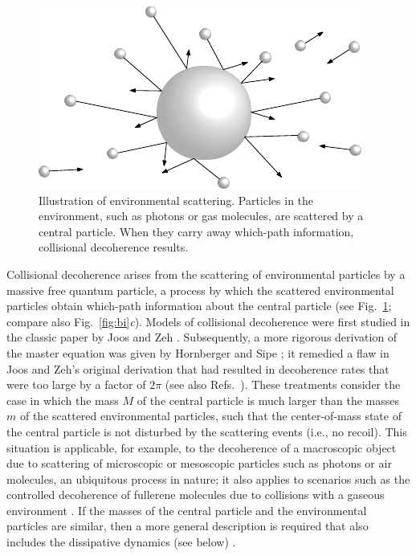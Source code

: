 \documentclass[3p,sort&compress,12pt]{elsarticle}
\begin{document}
\begin{figure}
\centering
\includegraphics[scale=0.7]{scatmod.pdf}
\caption{Illustration of environmental scattering. Particles in the environment, such as
  photons or gas molecules, are scattered by a central particle. When they carry away which-path information, collisional decoherence results.}
\label{fig:scatmod}
\end{figure}

Collisional decoherence arises from the scattering of environmental particles by a massive free quantum particle, a process by which the scattered environmental particles obtain which-path information about the central particle (see Fig.~\ref{fig:scatmod}; compare also Fig.~\ref{fig:bi}\emph{c}). Models of collisional decoherence were first studied in the classic paper by Joos and Zeh \cite{Joos:1985:iu}. Subsequently, a more rigorous derivation of the master equation was given by Hornberger and Sipe \cite{Hornberger:2003:un}; it remedied a flaw in Joos and Zeh's original derivation that had resulted in decoherence rates that were too large by a factor of $2\pi$ (see also Refs.~\cite{Gallis:1990:un,Diosi:1995:um,Adler:2006:yb}). These treatments consider the case in which the mass $M$ of the central particle is much larger than the masses $m$ of the scattered environmental particles, such that the center-of-mass state of the central particle is not disturbed by the scattering events (i.e., no recoil). This situation is applicable, for example, to the decoherence of a macroscopic object due to scattering of microscopic or mesoscopic particles such as photons or air molecules, an ubiquitous process in nature; it also applies to scenarios such as the controlled decoherence of fullerene molecules due to collisions with a gaseous environment \cite{Hackermuller:2003:uu,Hornberger:2003:tv}. If the masses of the central particle and the environmental particles are similar, then a more general description is required that also includes the dissipative dynamics (see below) \cite{Diosi:1995:um,Hornberger:2006:tb,Hornberger:2006:tc,Hornberger:2008:ii, Vacchini:2009:pp,Busse:2009:aa,Busse:2010:aa,Busse:2010:oo}. 
\end{document}
